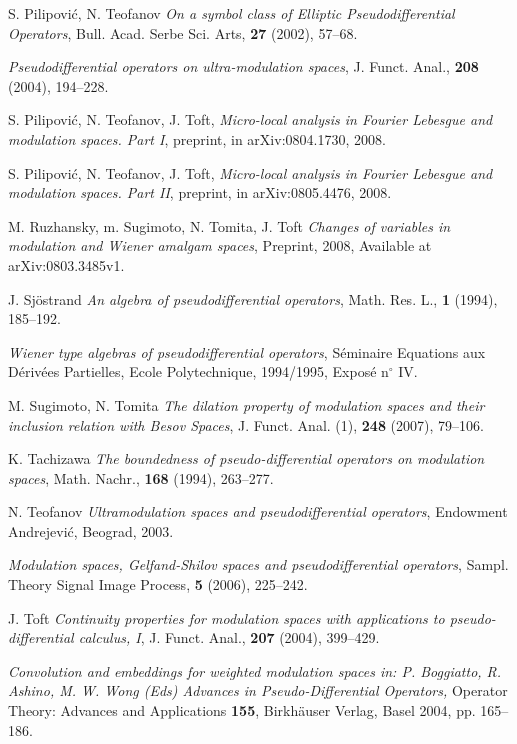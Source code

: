 \documentclass[12pt,a4paper,reqno]{amsart}
\numberwithin{equation}{section}
\numberwithin{thm}{section}
\theoremstyle{definition}
\theoremstyle{remark}
\begin{document}
\begin{thebibliography}{150}
 {S. Pilipovi\'c, N. Teofanov} \emph{On a symbol
class of Elliptic Pseudodifferential Operators}, {Bull. Acad.
Serbe Sci. Arts}, \textbf {27} (2002), 57--68.

 \bysame \emph{Pseudodifferential operators on
ultra-modulation spaces}, J. Funct. Anal., \textbf{208} (2004),
194--228.

 {S. Pilipovi\'c, N. Teofanov, J. Toft},
\emph{Micro-local analysis in Fourier Lebesgue and modulation
spaces. Part I}, preprint, in  arXiv:0804.1730, 2008.

 {S. Pilipovi\'c, N. Teofanov, J. Toft},
\emph{Micro-local analysis in Fourier Lebesgue and modulation
spaces. Part II}, preprint, in arXiv:0805.4476, 2008.

 M. Ruzhansky, m. Sugimoto, N. Tomita, J. Toft
\emph{Changes of variables in modulation and Wiener amalgam spaces},
Preprint, 2008, Available at arXiv:0803.3485v1.

  {J. Sj{\"o}strand} \emph{An algebra of
pseudodifferential operators}, {Math. Res. L.}, \textbf 1 (1994),
185--192.

 \bysame \emph{Wiener type algebras of
pseudodifferential operators}, S\'eminaire Equations aux D\'eriv\'ees
Partielles, Ecole Polytechnique, 1994/1995, {Expos\'e n$^{\circ}$ IV.}

 {M. Sugimoto, N. Tomita} \emph{The dilation
property of modulation spaces and their inclusion relation with Besov
Spaces}, {J. Funct. Anal. (1)}, \textbf{248} (2007),
79--106.

  {K. Tachizawa} \emph{The boundedness of
pseudo-differential operators on modulation spaces},
Math. Nachr., \textbf{168} (1994), 263--277.

  {N. Teofanov} \emph{Ultramodulation spaces and
pseudodifferential operators}, {Endowment Andrejevi\'c}, Beograd,
2003.

 \bysame \emph{Modulation spaces, Gelfand-Shilov
spaces and pseudodifferential operators}, Sampl. Theory Signal
Image Process, \textbf{5} (2006), 225--242.

 J. Toft \emph{Continuity properties for
modulation spaces with applications to pseudo-differential calculus,
I}, {J. Funct. Anal.}, \textbf{207} (2004),
399--429.

 \bysame \emph{Convolution and embeddings for
weighted modulation spaces {\rm {in: P. Boggiatto, R. Ashino,
M. W. Wong (Eds)}} Advances in Pseudo-Differential Operators,}
Operator Theory: Advances and Applications \textbf{155},
Birkh{\"a}user Verlag, Basel 2004, pp. 165--186.


\end{thebibliography}
\end{document}

